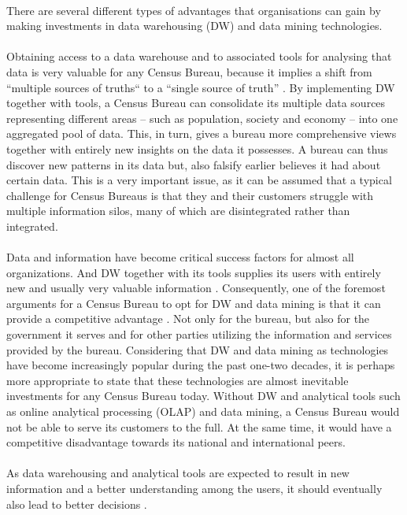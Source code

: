 \\
There are several different types of advantages that organisations can gain by making investments in data warehousing (DW) and data mining technologies.
\\\\
Obtaining access to a data warehouse and to associated tools for analysing that data is very valuable for any Census Bureau, 
because it implies a shift from “multiple sources of truths“ to a “single source of truth” \cite{l2video}. 
By implementing DW together with tools, a Census Bureau can consolidate its multiple data sources representing different areas -- 
such as population, society and economy -- into one aggregated pool of data. 
This, in turn, gives a bureau more comprehensive views together with entirely new insights on the data it possesses. 
A bureau can thus discover new patterns in its data but, also falsify earlier believes it had about certain data. 
This is a very important issue, 
as it can be assumed that a typical challenge for Census Bureaus is that they and their customers struggle with multiple information silos, 
many of which are disintegrated rather than integrated.
\\\\
Data and information have become critical success factors for almost all organizations. 
And DW together with its tools supplies its users with entirely new and usually very valuable information \cite[chapter~31.1.3]{CourseLitt}. 
Consequently, one of the foremost arguments for a Census Bureau to opt for DW and data mining is that it can provide a competitive advantage \cite{l2video}. 
Not only for the bureau, but also for the government it serves and for other parties utilizing the information and services provided by the bureau. 
Considering that DW and data mining as technologies have become increasingly popular during the past one-two decades, 
it is perhaps more appropriate to state that these technologies are almost inevitable investments for any Census Bureau today. 
Without DW and analytical tools such as online analytical processing (OLAP) and data mining, 
a Census Bureau would not be able to serve its customers to the full. 
At the same time, it would have a competitive disadvantage towards its national and international peers.
\\\\
As data warehousing and analytical tools are expected to result in new information and a better understanding among the users,
it should eventually also lead to better decisions \cite[chapter~31.1.3]{CourseLitt}. 
